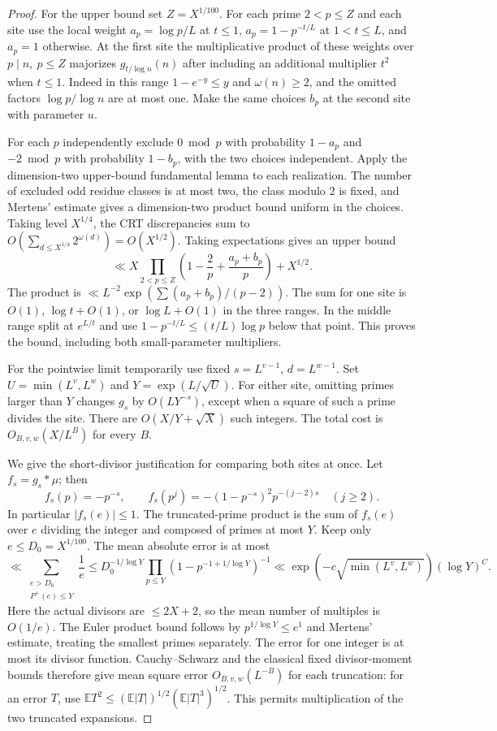 \documentclass[11pt]{article}
\newcommand{\E}{\mathbb E}
\begin{document}
\begin{proof}
For the upper bound set $Z=X^{1/100}$. For each prime $2<p\le Z$
and each site use the local weight $a_p=\log p/L$ at $t\le1$,
$a_p=1-p^{-t/L}$ at $1<t\le L$, and $a_p=1$ otherwise.
At the first site the multiplicative product of these weights over
$p\mid n,\ p\le Z$ majorizes $g_{t/\log n}(n)$ after including
an additional multiplier $t^2$ when $t\le1$. Indeed in this range
$1-e^{-y}\le y$ and $\omega(n)\ge2$, and the omitted factors
$\log p/\log n$ are at most one. Make the same choices $b_p$
at the second site with parameter $u$.

For each $p$ independently exclude $0\bmod p$ with probability
$1-a_p$ and $-2\bmod p$ with probability $1-b_p$, with the two
choices independent. Apply the dimension-two upper-bound fundamental
lemma \cite[Theorems 18.11, 19.1]{Kouk} to each realization. The
number of excluded odd residue classes is at most two, the class
modulo $2$ is fixed, and Mertens' estimate gives a dimension-two
product bound uniform in the choices. Taking level $X^{1/4}$, the CRT
discrepancies sum to $O(\sum_{d\le X^{1/4}}2^{\omega(d)})=O(X^{1/2})$.
Taking expectations gives an upper bound
\[
 \ll X\prod_{2<p\le Z}\!\left(1-\frac2p+
                  \frac{a_p+b_p}{p}\right)+X^{1/2}.
\]
The product is $\ll L^{-2}\exp(\sum(a_p+b_p)/(p-2))$. The sum for
one site is $O(1)$, $\log t+O(1)$, or $\log L+O(1)$ in the three
ranges. In the middle range split at $e^{L/t}$ and use
$1-p^{-t/L}\le(t/L)\log p$ below that point. This proves the bound,
including both small-parameter multipliers.

For the pointwise limit temporarily use fixed $s=L^{v-1}$,
$d=L^{w-1}$. Set $U=\min(L^v,L^w)$ and $Y=\exp(L/\sqrt U)$.
For either site, omitting primes larger than $Y$ changes $g_s$ by
$O(LY^{-s})$, except when a square of such a prime divides the site.
There are $O(X/Y+\sqrt X)$ such integers. The total cost is
$O_{B,v,w}(X/L^B)$ for every $B$.

We give the short-divisor justification for comparing both sites at
once. Let $f_s=g_s*\mu$; then
\[
 f_s(p)=-p^{-s},\qquad
 f_s(p^j)=-(1-p^{-s})^2p^{-(j-2)s}\quad(j\ge2).
\]
In particular $|f_s(e)|\le1$. The truncated-prime product is the
sum of $f_s(e)$ over $e$ dividing the integer and composed of
primes at most $Y$. Keep only $e\le D_0=X^{1/100}$. The mean
absolute error is at most
\[
 \ll \sum_{\substack{e>D_0\\P^+(e)\le Y}}\frac1e
 \le D_0^{-1/\log Y}
       \prod_{p\le Y}(1-p^{-1+1/\log Y})^{-1}
 \ll \exp(-c\sqrt{\min(L^v,L^w)})(\log Y)^C .
\]
Here the actual divisors are $\le 2X+2$, so the mean number of
multiples is $O(1/e)$. The Euler product bound follows by
$p^{1/\log Y}\le e^{1}$ and Mertens' estimate, treating the smallest
primes separately. The error for one integer is at most its divisor
function. Cauchy--Schwarz and the classical fixed divisor-moment
bounds therefore give mean square error $O_{B,v,w}(L^{-B})$ for
each truncation: for an error $T$, use
$\E T^2\le(\E |T|)^{1/2}(\E |T|^3)^{1/2}$.
This permits multiplication of the two truncated expansions.


\end{proof}
\end{document}
